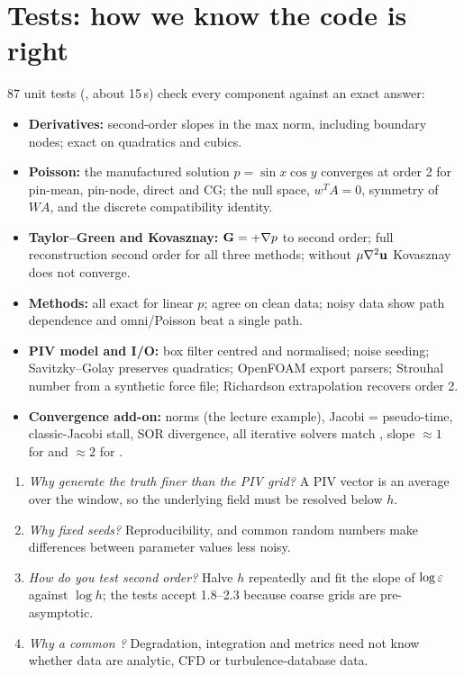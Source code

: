 \section{Tests: how we know the code is right}
87 unit tests (, about 15\,s) check every component against an exact answer:
\begin{itemize}
\item \textbf{Derivatives:} second-order slopes in the max norm, including boundary nodes; exact on quadratics and cubics.
\item \textbf{Poisson:} the manufactured solution $p=\sin x\cos y$ converges at order 2 for pin-mean, pin-node, direct and CG; the null space, $w^TA=0$, symmetry of $WA$, and the discrete compatibility identity.
\item \textbf{Taylor--Green and Kovasznay:} $\mathbf{G}=+\nabla p$ to second order; full reconstruction second order for all three methods; without $\mu\nabla^2\mathbf{u}$ Kovasznay does not converge.
\item \textbf{Methods:} all exact for linear $p$; agree on clean data; noisy data show path dependence and omni/Poisson beat a single path.
\item \textbf{PIV model and I/O:} box filter centred and normalised; noise seeding; Savitzky--Golay preserves quadratics; OpenFOAM export parsers; Strouhal number from a synthetic force file; Richardson extrapolation recovers order 2.
\item \textbf{Convergence add-on:} norms (the lecture example), Jacobi = pseudo-time, classic-Jacobi stall, SOR divergence, all iterative solvers match , slope $\approx1$ for  and $\approx2$ for .
\end{itemize}

\begin{viva}
\begin{enumerate}[leftmargin=*]
\item \emph{Why generate the truth finer than the PIV grid?} A PIV vector is an average over the window, so the underlying field must be resolved below $h$.
\item \emph{Why fixed seeds?} Reproducibility, and common random numbers make differences between parameter values less noisy.
\item \emph{How do you test second order?} Halve $h$ repeatedly and fit the slope of $\log\varepsilon$ against $\log h$; the tests accept 1.8--2.3 because coarse grids are pre-asymptotic.
\item \emph{Why a common ?} Degradation, integration and metrics need not know whether data are analytic, CFD or turbulence-database data.
\end{enumerate}
\end{viva}
